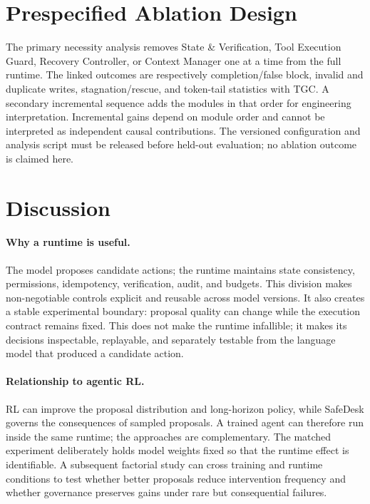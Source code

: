 \documentclass[10pt]{article}
\newcommand{\safedesk}{SafeDesk}
\begin{document}
\section{Prespecified Ablation Design}

The primary necessity analysis removes State \& Verification, Tool Execution
Guard, Recovery Controller, or Context Manager one at a time from the full runtime.
The linked outcomes are respectively completion/false block, invalid and duplicate
writes, stagnation/rescue, and token-tail statistics with TGC. A secondary
incremental sequence adds the modules in that order for engineering interpretation.
Incremental gains depend on module order and cannot be interpreted as independent
causal contributions. The versioned configuration and analysis script must be
released before held-out evaluation; no ablation outcome is claimed here.

\section{Discussion}

\paragraph{Why a runtime is useful.}
The model proposes candidate actions; the runtime maintains state consistency,
permissions, idempotency, verification, audit, and budgets. This division makes
non-negotiable controls explicit and reusable across model versions.
It also creates a stable experimental boundary: proposal quality can change while
the execution contract remains fixed. This does not make the runtime infallible;
it makes its decisions inspectable, replayable, and separately testable from the
language model that produced a candidate action.

\paragraph{Relationship to agentic RL.}
RL can improve the proposal distribution and long-horizon policy, while \safedesk{}
governs the consequences of sampled proposals. A trained agent can therefore run
inside the same runtime; the approaches are complementary.
The matched experiment deliberately holds model weights fixed so that the runtime
effect is identifiable. A subsequent factorial study can cross training and
runtime conditions to test whether better proposals reduce intervention frequency
and whether governance preserves gains under rare but consequential failures.
\end{document}

